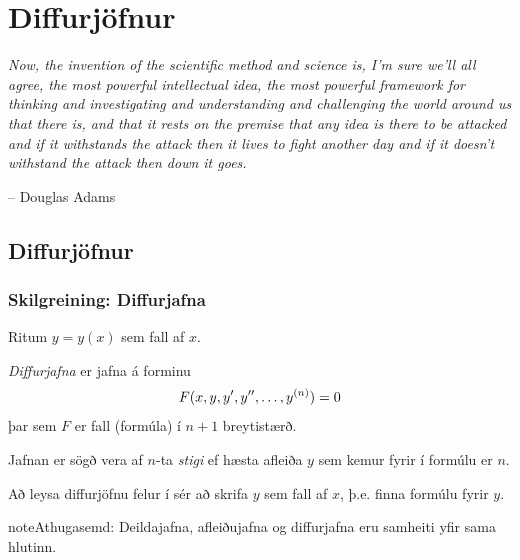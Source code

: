 \documentclass[a4paper,10pt,icelandic]{sphinxmanual}
\begin{document}
\chapter{Diffurjöfnur}
\label{kafli08::doc}\label{kafli08:diffurjofnur}
\emph{Now, the invention of the scientific method and science is, I'm sure
we'll all agree, the most powerful intellectual idea, the most powerful
framework for thinking and investigating and understanding and challenging
the world around us that there is, and that it rests on the premise that
any idea is there to be attacked and if it withstands the attack then it
lives to fight another day and if it doesn't withstand the attack then
down it goes.}

-- Douglas Adams


\section{Diffurjöfnur}
\label{kafli08:id1}\label{kafli08:index-0}

\subsection{Skilgreining: Diffurjafna}
\label{kafli08:diffurjafna}\label{kafli08:skilgreining-diffurjafna}
Ritum \(y=y(x)\) sem fall af \(x\).

\textit{Diffurjafna} er jafna á forminu
\begin{gather}
\begin{split}F(x, y, y', y'', \ldots, y^{(n)})=0\end{split}\notag
\end{gather}
þar sem \(F\) er fall (formúla) í \(n+1\) breytistærð.

Jafnan er sögð vera af \(n\)-ta \emph{stigi} ef hæsta afleiða \(y\)
sem kemur fyrir í formúlu er \(n\).

Að leysa diffurjöfnu felur í sér að skrifa \(y\) sem fall
af \(x\), þ.e. finna formúlu fyrir \(y\).

\begin{notice}{note}{Athugasemd:}
Deildajafna, afleiðujafna og diffurjafna eru samheiti yfir
sama hlutinn.
\end{notice}
\end{document}
